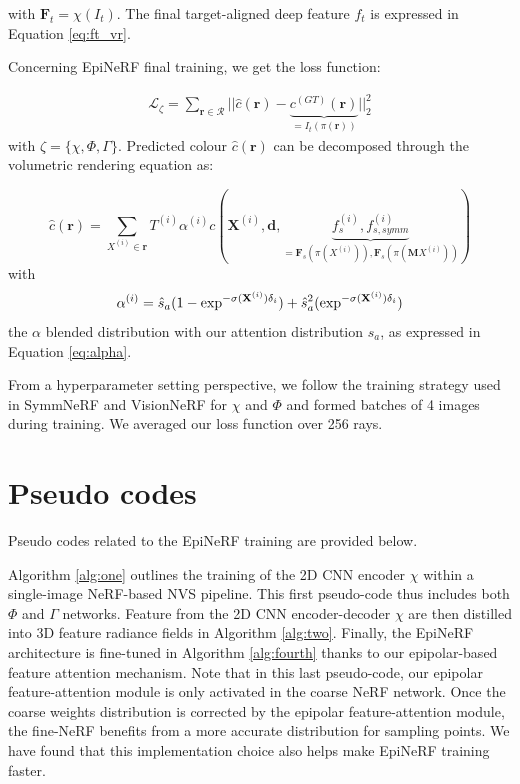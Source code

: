 \noindent with $\mathbf{F}_{t} = \chi(I_{t})$. The final target-aligned deep feature $f_{t}$ is expressed in Equation \ref{eq:ft_vr}. \newline

Concerning EpiNeRF final training, we get the loss function: 

\begin{equation}
\begin{split}
 \mathcal{L}_{\zeta}= \sum_{\mathbf{r}\in\mathcal{R}} || \hat{c}(\mathbf{r}) - \underbrace{c^{(GT)}(\mathbf{r})}_{= I_{t}(\pi(\mathbf{r}))} ||_{2}^{2}
\end{split}
\end{equation}
with $\zeta = \{\chi,\Phi,\Gamma\}$. Predicted colour $\hat{c}(\mathbf{r})$ can be decomposed through the volumetric rendering equation as: 

\begin{equation}
\hat{c}(\mathbf{r}) = \sum_{X^{(i)} \in \mathbf{r}}T^{(i)}\alpha^{(i)}c(\mathbf{X}^{(i)},\mathbf{d},\underbrace{f_{s}^{(i)},f_{s,symm}^{(i)}}_{= \mathbf{F}_{s}(\pi(X^{(i)})), \mathbf{F}_{s}(\pi(\mathbf{M}X^{(i)}))})
\end{equation}
with
\begin{equation}
\alpha^{(i)} = \hat{s}_{a}(1-\exp^{-\sigma(\mathbf{X}^{(i)})\delta_{i}}) + \hat{s}_{a}^{2}(\exp^{-\sigma(\mathbf{X}^{(i)})\delta_{i}}) \\
\end{equation}
the $\alpha$ blended distribution with our attention distribution $\hat{s}_{a}$, as expressed in Equation \ref{eq:alpha}. 

From a hyperparameter setting perspective, we follow the training strategy used in  SymmNeRF \citep{li2022symmnerf} and VisionNeRF \citep{lin2023vision} for $\chi$ and $\Phi$ and formed batches of 4 images during training. We averaged our loss function over 256 rays.

\section{Pseudo codes}

Pseudo codes related to the EpiNeRF training are provided below. 

Algorithm \ref{alg:one} outlines the training of the 2D \ac{CNN} encoder $\chi$ within a single-image \ac{NeRF}-based \ac{NVS} pipeline. This first pseudo-code thus includes both $\Phi$ and $\Gamma$ networks. Feature from the 2D \ac{CNN} encoder-decoder $\chi$ are then distilled into 3D feature radiance fields in Algorithm \ref{alg:two}. Finally, the EpiNeRF architecture is fine-tuned in Algorithm \ref{alg:fourth} thanks to our epipolar-based feature attention mechanism. Note that in this last pseudo-code, our epipolar feature-attention module is only activated in the coarse NeRF network. Once the coarse weights distribution is corrected by the epipolar feature-attention module, the fine-NeRF benefits from a more accurate distribution for sampling points. We have found that this implementation choice also helps make EpiNeRF training faster.

